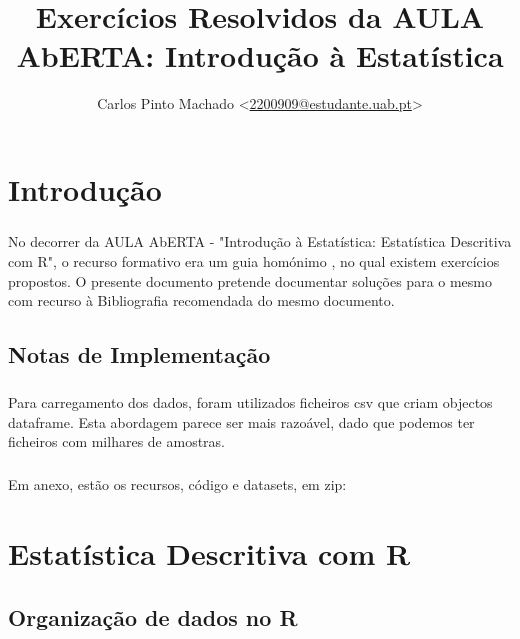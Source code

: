 \documentclass[11pt,a4paper]{report}
\author{Carlos Pinto Machado
	<\href{mailto:2200909@estudante.uab.pt}{2200909@estudante.uab.pt}>}
\title{Exercícios Resolvidos da AULA AbERTA: Introdução à Estatística}
\begin{document}
\maketitle
\tableofcontents

\clearpage

\chapter*{Introdução}

\paragraph{} No decorrer da AULA AbERTA - "Introdução à Estatística:
Estatística Descritiva com R"\cite{AulaAbertaIntroducaoEstatistica2017}, o
recurso formativo era um guia homónimo
\cite{OliveiraAulaAberta2017}, no qual existem
exercícios propostos. O presente documento pretende documentar soluções para o
mesmo com recurso à Bibliografia recomendada do mesmo
documento\cite{OliveiraEstatisticaDescritiva2011}.

\section*{Notas de Implementação}

\paragraph{} Para carregamento dos dados, foram utilizados ficheiros csv que
criam objectos dataframe. Esta abordagem parece ser mais razoável, dado que
podemos ter ficheiros com milhares de amostras.

\paragraph{} Em anexo, estão os recursos, código e datasets, em zip:

\clearpage

\setcounter{chapter}{2}
\chapter{Estatística Descritiva com R}
\section{Organização de dados no R}
\end{document}
